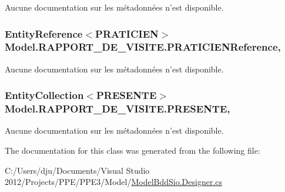 Aucune documentation sur les métadonnées n'est disponible. 

\hypertarget{class_model_1_1_r_a_p_p_o_r_t___d_e___v_i_s_i_t_e_a54eeb4d8f7c4a50370f1803ba841a36a}{
\subsubsection[{P\-R\-A\-T\-I\-C\-I\-E\-N\-Reference}]{\setlength{\rightskip}{0pt plus 5cm}Entity\-Reference$<${\bf P\-R\-A\-T\-I\-C\-I\-E\-N}$>$ Model.\-R\-A\-P\-P\-O\-R\-T\-\_\-\-D\-E\-\_\-\-V\-I\-S\-I\-T\-E.\-P\-R\-A\-T\-I\-C\-I\-E\-N\-Reference\hspace{0.3cm}{\ttfamily [get]}, {\ttfamily [set]}}}\label{class_model_1_1_r_a_p_p_o_r_t___d_e___v_i_s_i_t_e_a54eeb4d8f7c4a50370f1803ba841a36a}


Aucune documentation sur les métadonnées n'est disponible. 

\hypertarget{class_model_1_1_r_a_p_p_o_r_t___d_e___v_i_s_i_t_e_a78d24aba4a7730f7dcd96bc508376855}{
\subsubsection[{P\-R\-E\-S\-E\-N\-T\-E}]{\setlength{\rightskip}{0pt plus 5cm}Entity\-Collection$<${\bf P\-R\-E\-S\-E\-N\-T\-E}$>$ Model.\-R\-A\-P\-P\-O\-R\-T\-\_\-\-D\-E\-\_\-\-V\-I\-S\-I\-T\-E.\-P\-R\-E\-S\-E\-N\-T\-E\hspace{0.3cm}{\ttfamily [get]}, {\ttfamily [set]}}}\label{class_model_1_1_r_a_p_p_o_r_t___d_e___v_i_s_i_t_e_a78d24aba4a7730f7dcd96bc508376855}


Aucune documentation sur les métadonnées n'est disponible. 



The documentation for this class was generated from the following file\-:\begin{DoxyCompactItemize}
\item 
C\-:/\-Users/dju/\-Documents/\-Visual Studio 2012/\-Projects/\-P\-P\-E/\-P\-P\-E3/\-Model/\hyperlink{_model_bdd_sio_8_designer_8cs}{Model\-Bdd\-Sio.\-Designer.\-cs}\end{DoxyCompactItemize}
